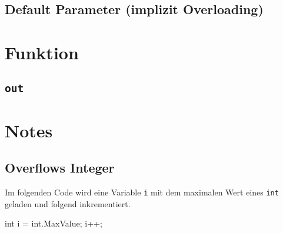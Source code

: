 \documentclass[
  10pt,
  a4paperpaper,
  DIV=11,
  numbers=noendperiod]{scrartcl}
\newenvironment{Shaded}{}{}
\newcommand{\DataTypeTok}[1]{\textcolor[rgb]{0.84,0.23,0.29}{#1}}
\newcommand{\FunctionTok}[1]{\textcolor[rgb]{0.44,0.26,0.76}{#1}}
\newcommand{\NormalTok}[1]{\textcolor[rgb]{0.14,0.16,0.18}{#1}}
\newcommand{\OperatorTok}[1]{\textcolor[rgb]{0.14,0.16,0.18}{#1}}
\begin{document}
\begin{multicols}{2}
\hypertarget{default-parameter-implizit-overloading}{%
\subsection{Default Parameter (implizit
Overloading)}\label{default-parameter-implizit-overloading}}

\begin{Shaded}
\begin{Highlighting}[]

\end{Highlighting}
\end{Shaded}

\hypertarget{funktion}{%
\section{Funktion}\label{funktion}}

\hypertarget{out}{%
\subsection{\texorpdfstring{\texttt{out}}{out}}\label{out}}

\begin{Shaded}
\begin{Highlighting}[]

\end{Highlighting}
\end{Shaded}

\hypertarget{notes}{%
\section{Notes}\label{notes}}

\hypertarget{overflows-integer}{%
\subsection{Overflows Integer}\label{overflows-integer}}

Im folgenden Code wird eine Variable \texttt{i} mit dem maximalen Wert
eines \texttt{int} geladen und folgend inkrementiert.

\begin{Shaded}
\begin{Highlighting}[]
\DataTypeTok{int}\NormalTok{ i }\OperatorTok{=} \DataTypeTok{int}\OperatorTok{.}\FunctionTok{MaxValue}\OperatorTok{;}
\NormalTok{i}\OperatorTok{++;}
\end{Highlighting}
\end{Shaded}


\end{multicols}
\end{document}
